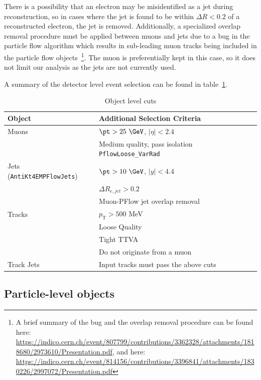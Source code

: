 There is a possibility that an electron may be misidentified as a jet during reconstruction, so in cases where the jet is found to be within $\Delta R < 0.2$ of a reconstructed electron, the jet is removed.
Additionally, a specialized overlap removal procedure must be applied between muons and jets due to a bug in the particle flow algorithm which results in sub-leading muon tracks being included in the particle flow objects~\footnote{A brief summary of the bug and the overlap removal procedure can be found here: \url{https://indico.cern.ch/event/807799/contributions/3362328/attachments/1818680/2973610/Presentation.pdf},
and here: \url{https://indico.cern.ch/event/814156/contributions/3396841/attachments/1830226/2997072/Presentation.pdf}}.
The muon is preferentially kept in this case, so it does not limit our analysis as the jets are not currently used.

A summary of the detector level event selection can be found in table~\ref{tab:ObjCuts}.


\begin{table}[h!]
    \centering
    \begin{tabular}{l|l}
    \hline
     \textbf{Object} & \textbf{Additional Selection Criteria} \\ \hline
     Muons & $\pt>25~\GeV$, $|\eta|<2.4$ \\
           & Medium quality, pass isolation \texttt{PflowLoose\_VarRad} \\ \hline
     Jets (\texttt{AntiKt4EMPFlowJets}) & $\pt>10~\GeV$, $|y|<4.4$ \\
                                        & $\Delta R_{e,jet} > 0.2$ \\
                                        & Muon-PFlow jet overlap removal \\ \hline
     Tracks & $p_{\text{T}} > 500$ MeV \\
            & Loose Quality \\
            & Tight TTVA \\
            & Do not originate from a muon \\ \hline
     Track Jets & Input tracks must pass the above cuts \\ \hline
    \end{tabular}
    \caption{Object level cuts}
    \label{tab:ObjCuts}
\end{table}

\subsection{Particle-level objects}

